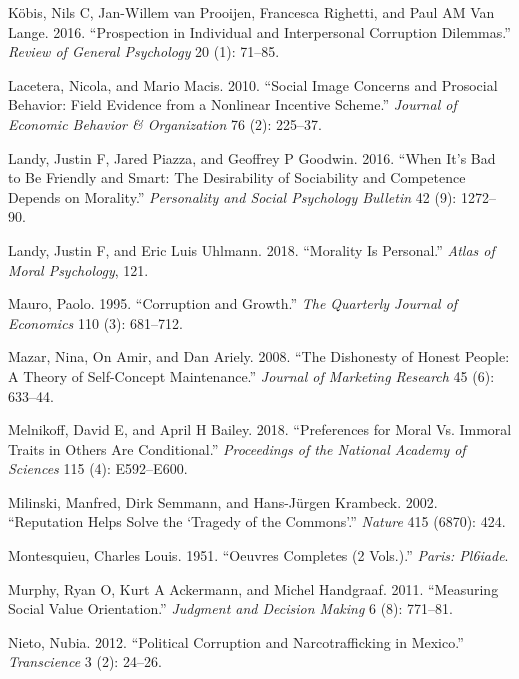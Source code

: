\documentclass[man]{apa6}
\begin{document}
\leavevmode\hypertarget{ref-kobis2016prospection}{}%
Köbis, Nils C, Jan-Willem van Prooijen, Francesca Righetti, and Paul AM
Van Lange. 2016. ``Prospection in Individual and Interpersonal
Corruption Dilemmas.'' \emph{Review of General Psychology} 20 (1):
71--85.

\leavevmode\hypertarget{ref-lacetera2010social}{}%
Lacetera, Nicola, and Mario Macis. 2010. ``Social Image Concerns and
Prosocial Behavior: Field Evidence from a Nonlinear Incentive Scheme.''
\emph{Journal of Economic Behavior \& Organization} 76 (2): 225--37.

\leavevmode\hypertarget{ref-landy2016s}{}%
Landy, Justin F, Jared Piazza, and Geoffrey P Goodwin. 2016. ``When It's
Bad to Be Friendly and Smart: The Desirability of Sociability and
Competence Depends on Morality.'' \emph{Personality and Social
Psychology Bulletin} 42 (9): 1272--90.

\leavevmode\hypertarget{ref-landy2018morality}{}%
Landy, Justin F, and Eric Luis Uhlmann. 2018. ``Morality Is Personal.''
\emph{Atlas of Moral Psychology}, 121.

\leavevmode\hypertarget{ref-mauro1995corruption}{}%
Mauro, Paolo. 1995. ``Corruption and Growth.'' \emph{The Quarterly
Journal of Economics} 110 (3): 681--712.

\leavevmode\hypertarget{ref-mazar2008dishonesty}{}%
Mazar, Nina, On Amir, and Dan Ariely. 2008. ``The Dishonesty of Honest
People: A Theory of Self-Concept Maintenance.'' \emph{Journal of
Marketing Research} 45 (6): 633--44.

\leavevmode\hypertarget{ref-melnikoff2018preferences}{}%
Melnikoff, David E, and April H Bailey. 2018. ``Preferences for Moral
Vs. Immoral Traits in Others Are Conditional.'' \emph{Proceedings of the
National Academy of Sciences} 115 (4): E592--E600.

\leavevmode\hypertarget{ref-milinski2002reputation}{}%
Milinski, Manfred, Dirk Semmann, and Hans-Jürgen Krambeck. 2002.
``Reputation Helps Solve the `Tragedy of the Commons'.'' \emph{Nature}
415 (6870): 424.

\leavevmode\hypertarget{ref-montesquieu1951oeuvres}{}%
Montesquieu, Charles Louis. 1951. ``Oeuvres Completes (2 Vols.).''
\emph{Paris: Pl6iade}.

\leavevmode\hypertarget{ref-murphy2011measuring}{}%
Murphy, Ryan O, Kurt A Ackermann, and Michel Handgraaf. 2011.
``Measuring Social Value Orientation.'' \emph{Judgment and Decision
Making} 6 (8): 771--81.

\leavevmode\hypertarget{ref-nieto2012political}{}%
Nieto, Nubia. 2012. ``Political Corruption and Narcotrafficking in
Mexico.'' \emph{Transcience} 3 (2): 24--26.
\end{document}

